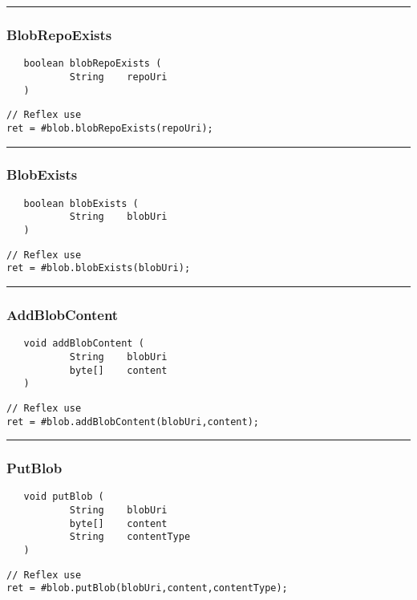 \rule{15cm}{2pt}
\subsubsection{BlobRepoExists}
\label{Api:BlobRepoExists}
\begin{verbatim}
   boolean blobRepoExists (
           String    repoUri
   )
\end{verbatim}
\begin{lstlisting}[language=reflex]
// Reflex use
ret = #blob.blobRepoExists(repoUri);
\end{lstlisting}



\rule{15cm}{2pt}
\subsubsection{BlobExists}
\label{Api:BlobExists}
\begin{verbatim}
   boolean blobExists (
           String    blobUri
   )
\end{verbatim}
\begin{lstlisting}[language=reflex]
// Reflex use
ret = #blob.blobExists(blobUri);
\end{lstlisting}



\rule{15cm}{2pt}
\subsubsection{AddBlobContent}
\label{Api:AddBlobContent}
\begin{verbatim}
   void addBlobContent (
           String    blobUri
           byte[]    content
   )
\end{verbatim}
\begin{lstlisting}[language=reflex]
// Reflex use
ret = #blob.addBlobContent(blobUri,content);
\end{lstlisting}



\rule{15cm}{2pt}
\subsubsection{PutBlob}
\label{Api:PutBlob}
\begin{verbatim}
   void putBlob (
           String    blobUri
           byte[]    content
           String    contentType
   )
\end{verbatim}
\begin{lstlisting}[language=reflex]
// Reflex use
ret = #blob.putBlob(blobUri,content,contentType);
\end{lstlisting}



